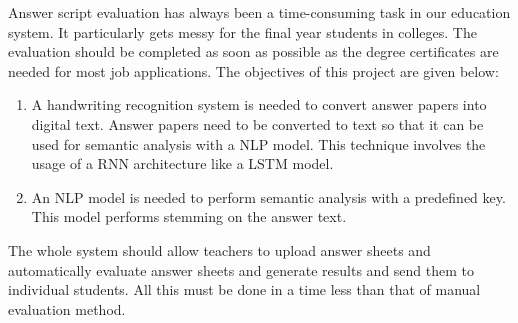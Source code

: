 Answer script evaluation has always been a time-consuming task in our education
system. It particularly gets messy for the final year students in colleges. The evaluation should
be completed as soon as possible as the degree certificates are needed for most job applications.
The objectives of this project are given below:
\begin{enumerate}
    \item  A handwriting recognition system is needed to convert answer papers into digital
    text. Answer papers need to be converted to text so that it can be used for 
    semantic analysis with a NLP model. This technique involves the usage of a
    RNN architecture like a LSTM model.
    \item An NLP model is needed to perform semantic analysis with a predefined key.
    This model performs stemming on the answer text.
\end{enumerate}
The whole system should allow teachers to upload answer sheets and automatically evaluate
answer sheets and generate results and send them to individual students. All this must be
done in a time less than that of manual evaluation method.